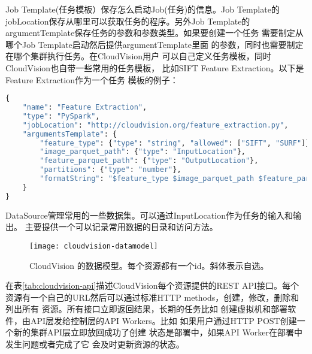Job Template(任务模板）保存怎么启动Job(任务)的信息。Job Template的
jobLocation保存从哪里可以获取任务的程序。另外Job Template的
argumentTemplate保存任务的参数和参数类型。如果要创建一个任务
需要制定从哪个Job Template启动然后提供argumentTemplate里面
的参数，同时也需要制定在哪个集群执行任务。在CloudVision用户
可以自己定义任务模板，同时CloudVision也自带一些常用的任务模板，
比如SIFT Feature Extraction。以下是Feature Extraction作为一个任务
模板的例子：
\begin{lstlisting}[language=Python,basicstyle=\tiny,showstringspaces=false]
{
    "name": "Feature Extraction",
    "type": "PySpark",
    "jobLocation": "http://cloudvision.org/feature_extraction.py",
    "argumentsTemplate": {
        "feature_type": {"type": "string", "allowed": ["SIFT", "SURF"]},
        "image_parquet_path": {"type": "InputLocation"},
        "feature_parquet_path": {"type": "OutputLocation"},
        "partitions": {"type": "number"},
        "formatString": "$feature_type $image_parquet_path $feature_parquet_path $partitions"
    }
}
\end{lstlisting}

DataSource管理常用的一些数据集。可以通过InputLocation作为任务的输入和输出。
主要提供一个可以记录常用数据的目录和访问方法。

\begin{figure}[h]
  \centering
    \texttt{[image: cloudvision-datamodel]}
  \caption{CloudVision 的数据模型。每个资源都有一个id。斜体表示自选。}
  \label{fig:cloudvision-datamodel}
\end{figure}

在表\ref{tab:cloudvision-api}描述CloudVision每个资源提供的REST API接口。每个
资源有一个自己的URL然后可以通过标准HTTP methods，创建，修改，删除和列出所有
资源。\cite{wiki:rest}所有接口立即返回结果，长期的任务比如
创建虚拟机和部署软件，由API层发给控制层的API Workers。比如
如果用户通过HTTP POST创建一个新的集群API层立即放回成功了创建
状态是部署中，如果API Worker在部署中发生问题或者完成了它
会及时更新资源的状态。

